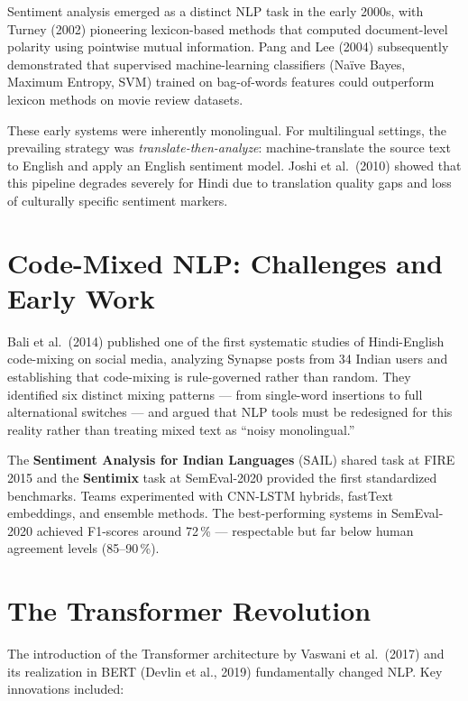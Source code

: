 \documentclass[12pt,a4paper]{report}
\begin{document}
Sentiment analysis emerged as a distinct NLP task in the early 2000s, with Turney (2002) \cite{turney2002} pioneering lexicon-based methods that computed document-level polarity using pointwise mutual information. Pang and Lee (2004) \cite{panglee2004} subsequently demonstrated that supervised machine-learning classifiers (Na\"ive Bayes, Maximum Entropy, SVM) trained on bag-of-words features could outperform lexicon methods on movie review datasets.

These early systems were inherently monolingual. For multilingual settings, the prevailing strategy was \emph{translate-then-analyze}: machine-translate the source text to English and apply an English sentiment model. Joshi et al.\ (2010) \cite{joshi2010} showed that this pipeline degrades severely for Hindi due to translation quality gaps and loss of culturally specific sentiment markers.

\section{Code-Mixed NLP: Challenges and Early Work}

Bali et al.\ (2014) \cite{bali2014} published one of the first systematic studies of Hindi-English code-mixing on social media, analyzing Synapse posts from 34 Indian users and establishing that code-mixing is rule-governed rather than random. They identified six distinct mixing patterns — from single-word insertions to full alternational switches — and argued that NLP tools must be redesigned for this reality rather than treating mixed text as ``noisy monolingual.''

The \textbf{Sentiment Analysis for Indian Languages} (SAIL) shared task at FIRE 2015 \cite{patra2015} and the \textbf{Sentimix} task at SemEval-2020 \cite{patwa2020} provided the first standardized benchmarks. Teams experimented with CNN-LSTM hybrids, fastText embeddings, and ensemble methods. The best-performing systems in SemEval-2020 achieved F1-scores around 72\,\% — respectable but far below human agreement levels (85--90\,\%).

\section{The Transformer Revolution}

The introduction of the Transformer architecture by Vaswani et al.\ (2017) \cite{vaswani2017} and its realization in BERT (Devlin et al., 2019) \cite{devlin2019} fundamentally changed NLP. Key innovations included:
\end{document}

